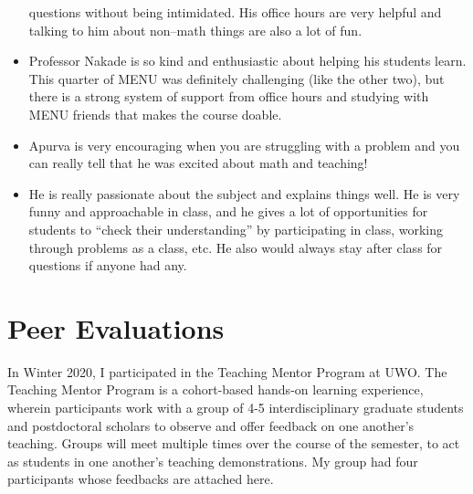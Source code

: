 \documentclass[
]{report}
\begin{document}
\begin{itemize}
  questions without being intimidated. His office hours are very helpful and talking to him about non--math things are also a lot of fun.
\item
  Professor Nakade is so kind and enthusiastic about helping his students learn. This quarter of MENU was definitely challenging
  (like the other two), but there is a strong system of support from office hours and studying with MENU friends that makes the course
  doable.
\item
  Apurva is very encouraging when you are struggling with a problem and you can really tell that he was excited about math and
  teaching!\\
\item
  He is really passionate about the subject and explains things well. He is very funny and approachable in class, and he gives a lot of
  opportunities for students to ``check their understanding'' by participating in class, working through problems as a class, etc. He
  also would always stay after class for questions if anyone had any.
\end{itemize}

\hypertarget{peer-evaluations}{%
\section{Peer Evaluations}\label{peer-evaluations}}

In Winter 2020, I participated in the Teaching Mentor Program at UWO.
The Teaching Mentor Program is a cohort-based hands-on learning experience, wherein participants
work with a group of 4-5 interdisciplinary graduate students and postdoctoral scholars to observe
and offer feedback on one another's teaching. Groups will meet multiple times over the course of
the semester, to act as students in one another's teaching demonstrations. My group had four
participants whose feedbacks are attached here.
\end{document}
